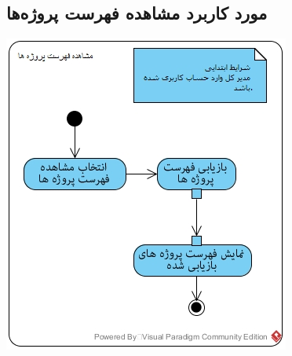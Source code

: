 \subsection*{مورد کاربرد مشاهده فهرست پروژه‌ها}
\vspace{2cm}
\begin{center}
\includegraphics[width=\textwidth]{ActivityDiagrams/32.jpg}
\end{center}

\newpage
\vspace{2cm}
